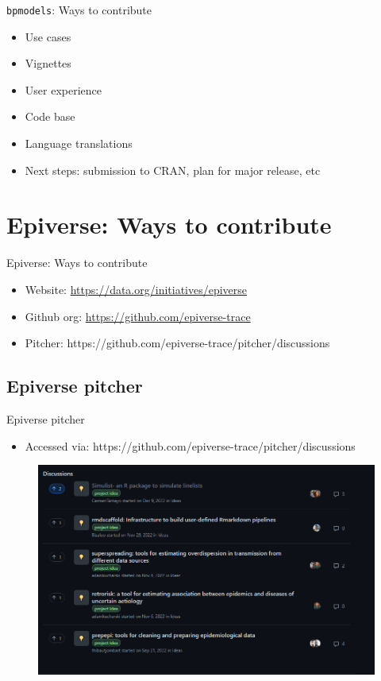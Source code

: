 \documentclass[10pt]{beamer}
\begin{document}
\begin{frame}[fragile]{\texttt{bpmodels}: Ways to contribute}
\begin{itemize}
\item Use cases
\item Vignettes
\item User experience
\item Code base
\item Language translations
\item Next steps: submission to CRAN, plan for major release, etc
\end{itemize}
\end{frame}

\section{Epiverse: Ways to contribute}
\begin{frame}[fragile]{Epiverse: Ways to contribute}
	\begin{itemize}
\item Website: \url{https://data.org/initiatives/epiverse}
\item Github org: \url{https://github.com/epiverse-trace}
\item Pitcher: {https://github.com/epiverse-trace/pitcher/discussions}
	\end{itemize}
\end{frame}

\subsection{Epiverse pitcher}
\begin{frame}[fragile]{Epiverse pitcher}
	\begin{itemize}
\item Accessed via: {https://github.com/epiverse-trace/pitcher/discussions}
\end{itemize}	
\begin{figure}
	\centering
	\includegraphics[scale=0.45]{../figures/pitcher.png}
\end{figure}
\end{frame}
\end{document}
